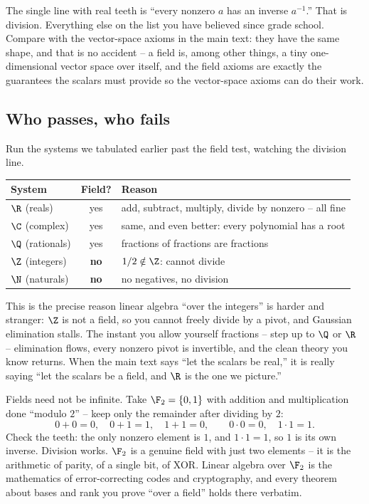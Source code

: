 The single line with real teeth is ``every nonzero $a$ has an inverse $a^{-1}$.'' That is
division. Everything else on the list you have believed since grade school. Compare with
the vector-space axioms in the main text: they have the same shape, and that is no
accident -- a field is, among other things, a tiny one-dimensional vector space over
itself, and the field axioms are exactly the guarantees the scalars must provide so the
vector-space axioms can do their work.

\subsection{Who passes, who fails}

Run the systems we tabulated earlier past the field test, watching the division line.

\begin{center}
\begin{tabular}{lcl}
\toprule
System & Field? & Reason \\
\midrule
$\R$ (reals) & yes & add, subtract, multiply, divide by nonzero -- all fine \\
$\C$ (complex) & yes & same, and even better: every polynomial has a root \\
$\Q$ (rationals) & yes & fractions of fractions are fractions \\
$\Z$ (integers) & \textbf{no} & $1/2 \notin \Z$: cannot divide \\
$\N$ (naturals) & \textbf{no} & no negatives, no division \\
\bottomrule
\end{tabular}
\end{center}

This is the precise reason linear algebra ``over the integers'' is harder and stranger:
$\Z$ is not a field, so you cannot freely divide by a pivot, and Gaussian elimination
stalls. The instant you allow yourself fractions -- step up to $\Q$ or $\R$ -- elimination
flows, every nonzero pivot is invertible, and the clean theory you know returns. When the
main text says ``let the scalars be real,'' it is really saying ``let the scalars be a
field, and $\R$ is the one we picture.''

\begin{example}\label{ch38:f2}
Fields need not be infinite. Take $\F_2 = \{0, 1\}$ with addition and multiplication done
``modulo $2$'' -- keep only the remainder after dividing by $2$:
\[
  0+0=0,\quad 0+1=1,\quad 1+1=0,\qquad
  0\cdot 0 = 0,\quad 1\cdot 1 = 1.
\]
Check the teeth: the only nonzero element is $1$, and $1\cdot 1 = 1$, so $1$ is its own
inverse. Division works. $\F_2$ is a genuine field with just two elements -- it is the
arithmetic of parity, of a single bit, of XOR. Linear algebra over $\F_2$ is the
mathematics of error-correcting codes and cryptography, and every theorem about bases and
rank you prove ``over a field'' holds there verbatim.
\end{example}

